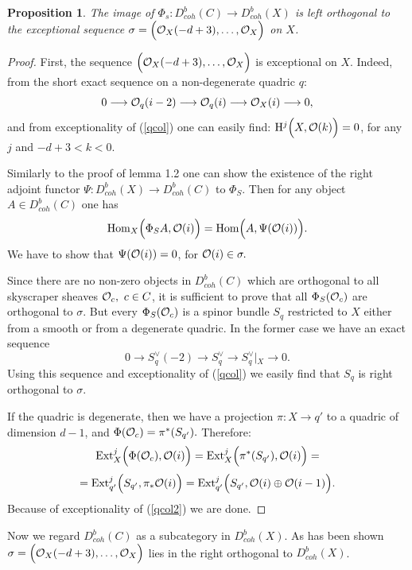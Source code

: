 \documentclass[12pt]{article}
\newtheorem{proposition}[theorem]{Proposition}
\def\db#1{ D^b_{coh}({#1})}
\begin{document}
\begin{proposition}\label{orthog} The image of 
$\Phi_s:D^b_{coh}(C)\longrightarrow D^b_{coh}(X)$ is left orthogonal to the exceptional sequence $\sigma=
\Bigl({\cal O}_X(-d+3),\ldots,{\cal O}_X\Bigr) $ on $X$.
\end{proposition}
\begin{proof}
First, the sequence $\Bigl({\cal O}_X(-d+3),\ldots,{\cal O}_X\Bigr)$ is exceptional on $X$. Indeed, from the short exact sequence on a non-degenerate quadric $q$:
$$0\longrightarrow {\cal O}_q(i-2)
\longrightarrow {\cal O}_q(i)\longrightarrow {\cal O}_X(i)
\longrightarrow 0,$$
and from exceptionality of (\ref{qcol}) one can easily find: ${\rm H}^j\Bigl(X,{\cal O}(k)\Bigr)=0$, for any $j$ and $-d+3<k<0$.

Similarly to the proof of lemma 1.2 one can show the existence of the right adjoint functor $\Psi:D^b_{coh}(X)\longrightarrow D^b_{coh}(C)$ to $\Phi_S$.
Then for any object $A\in D^b_{coh}(C)$ one has
$${\rm Hom}_X\Bigl(\Phi_SA,{\cal O}(i)\Bigr)={\rm Hom}\Bigl(A,\Psi({\cal O}(i))\Bigr).$$
We have to show that $\Psi({\cal O}(i))=0$, for ${\cal O}(i)\in \sigma.$
 
Since there are no non-zero objects in $D^b_{coh}(C)$ which are orthogonal to all skyscraper sheaves ${\cal O}_c,\ c\in C$, it is sufficient to prove that all $\Phi_S({\cal O}_c)$ are orthogonal to $\sigma$. But every $\Phi_S({\cal O}_c)$ is a spinor bundle $S_q$ restricted to $X$ either from a smooth or from a degenerate quadric. In the former case we have an exact sequence
$$
0\longrightarrow S_q^{\vee}(-2)\longrightarrow S_q^{\vee}
\longrightarrow  S_q^{\vee}\left|_X\right.\longrightarrow 0.$$
Using this sequence and exceptionality of (\ref{qcol}) we easily find that $S_q$ is right orthogonal to $\sigma$.

If the quadric is degenerate, then we have a projection
$\pi:X\longrightarrow q'$ to a quadric of dimension $d-1$, and $\Phi({\cal O}_c)=\pi^*(S_{q'}).$ Therefore:
$${\rm Ext}^j_X\Bigl(\Phi({\cal O}_c),{\cal O}(i) \Bigr)=
{\rm Ext}^j_X\Bigl(\pi^*(S_{q'}),{\cal O}(i) \Bigr)=$$ $$={\rm Ext}^j_{q'}\Bigl(S_{q'},\pi_*{\cal O}(i) \Bigr)={\rm Ext}^j_{q'}\Bigl(S_{q'},{\cal O}(i)\oplus {\cal O}(i-1) \Bigr).$$
Because of exceptionality of (\ref{qcol2}) we are done.
\end{proof}

Now we regard $\db{C}$ as a subcategory in  $\db{X}$.
As has been shown $\sigma=
\Bigl({\cal O}_X(-d+3),\ldots,{\cal O}_X\Bigr) $ lies in the right orthogonal to $\db{X}$.
\end{document}
